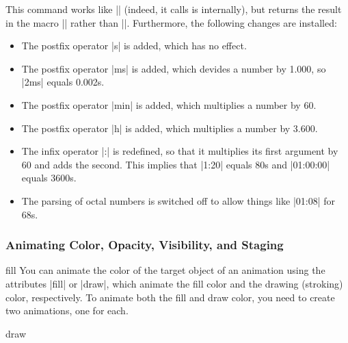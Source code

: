 \begin{command}{\pgfparsetime{}}
  This command works like |\pgfmathparse| (indeed, it calls is
  internally), but returns the result in the macro |\pgftimeresult|
  rather than |\pgfmathresult|. Furthermore, the following changes are
  installed:

  \begin{itemize}
  \item 
    The postfix operator |s| is added, which has no effect.
  \item The postfix operator |ms| is added, which devides a number by
    1.000, so |2ms| equals 0.002s.
  \item
    The postfix operator |min| is added, which multiplies a number by
    60.
  \item The postfix operator |h| is added, which multiplies a number by
    3.600.
  \item The infix operator |:| is redefined, so that it multiplies its
    first argument by 60 and adds the second. This implies that
    |1:20| equals 80s and |01:00:00| equals 3600s.
  \item The parsing of octal numbers is switched off to allow things
    like |01:08| for 68s.
  \end{itemize}
\end{command}



\subsubsection{Animating Color, Opacity, Visibility, and Staging}
\label{section-base-animation-painting}

\begin{animateattribute}{fill}
  You can animate the color of the target object of an animation using
  the attributes |fill| or |draw|, which animate the fill color and the
  drawing (stroking) color, respectively. To animate both the fill and
  draw color, you need to create two animations, one for each.

\begin{codeexample}[width=2.3cm]
\end{codeexample}
\end{animateattribute}

\begin{animateattribute}{draw}
\begin{codeexample}[width=2.3cm]
\end{codeexample}
\end{animateattribute}

